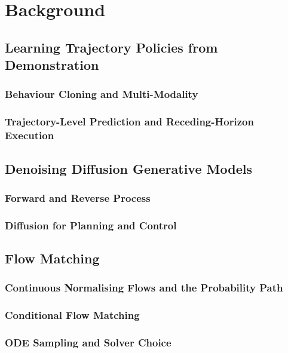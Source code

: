 \documentclass[headsepline,footsepline,footinclude=false,oneside,fontsize=11pt,paper=a4,listof=totoc,bibliography=totoc]{scrbook}
\begin{document}
\chapter{Background}\label{ch:background}

\section{Learning Trajectory Policies from Demonstration}\label{sec:bg:il}
\subsection{Behaviour Cloning and Multi-Modality}\label{sec:bg:il:bc}
\subsection{Trajectory-Level Prediction and Receding-Horizon Execution}\label{sec:bg:il:horizon}

\section{Denoising Diffusion Generative Models}\label{sec:bg:diffusion}
\subsection{Forward and Reverse Process}\label{sec:bg:diffusion:process}
\subsection{Diffusion for Planning and Control}\label{sec:bg:diffusion:planning}

\section{Flow Matching}\label{sec:bg:fm}
\subsection{Continuous Normalising Flows and the Probability Path}\label{sec:bg:fm:path}
\subsection{Conditional Flow Matching}\label{sec:bg:fm:cfm}
\subsection{ODE Sampling and Solver Choice}\label{sec:bg:fm:ode}
\end{document}
